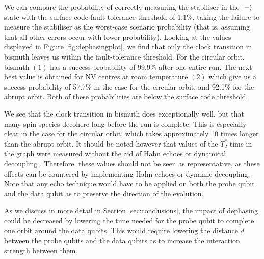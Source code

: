 We can compare the probability of correctly measuring the stabiliser in the $\ket{-}$ state with the surface code fault-tolerance threshold of $1.1\%$, taking the failure to measure the stabiliser as the worst-case scenario probability (that is, assuming that all other errors occur with lower probability). Looking at the values displayed in Figure \ref{fig:dephasingplot}, we find that only the clock transition in bismuth leaves us within the fault-tolerance threshold. For the circular orbit, bismuth $(1)$ has a success probability of  99.9\% after one entire run.  The next best value is obtained for NV centres at room temperature $(2)$ which give us a success probability of 57.7\% in the case for the circular orbit, and 92.1\% for the abrupt orbit. Both of these probabilities are below the surface code threshold. 

We see that the clock transition in bismuth does exceptionally well, but that many spin species decohere long before the run is complete. This is especially clear in the case for the circular orbit, which takes approximately $10$ times longer than the abrupt orbit. It should be noted however that values of the  $T_2^*$ time in the graph were measured without the aid of Hahn echoes \cite{levitt1979nmr} or dynamical decoupling \cite{viola1998dynamical}. Therefore, these values should not be seen as representative, as these effects can be countered by implementing Hahn echoes or dynamic decoupling. Note that any echo technique would have to be applied on both the probe qubit and the data qubit as to preserve the direction of the evolution. 

As we discuss in more detail in Section \ref{sec:conclusions}, the impact of dephasing could be decreased by lowering the time needed for the probe qubit to complete one orbit around the data qubits. This would require lowering the distance $d$ between the probe qubits and the data qubits as to increase the interaction strength between them. 














